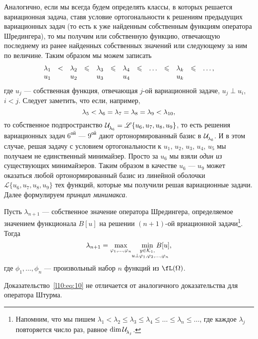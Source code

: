 Аналогично, если мы всегда будем определять классы, в которых решается вариационная задача, ставя условие ортогональности к решениям предыдущих вариационных задач (то есть к уже найденным собственным функциям оператора Шредингера), то мы получим или собственную функцию, отвечающую последнему из ранее найденных собственных значений или следующему за ним по величине. Таким образом мы можем записать
\begin{equation}\label{l10:eq:9}
	\hfill\begin{array}{ccccccccccccc}
		\lambda_1&<&\lambda_2&\leqslant&\lambda_3&\leqslant&\lambda_4&\leqslant&\ldots&\leqslant&\lambda_k&\leqslant&\ldots,\\
		u_1& &u_2& &u_3& &u_4& & & &u_k& &\\
	\end{array}\hfill
\end{equation} 
где $u_j$ --- собственная функция, отвечающая $j$-ой вариационной задаче, $u_j\perp u_i$, $i<j$. Следует заметить, что если, например, 
\begin{equation*}
	\hfill\lambda_5<\lambda_6=\lambda_7=\lambda_8=\lambda_9<\lambda_{10},\hfill
\end{equation*}
то собственное подпространство $\Ul[\lambda_6]=\mathscr{L}\{u_6,u_7,u_8,u_9\}$, то есть решения вариационных задач $6^{\text{ой}}$ --- $9^{\text{ой}}$ дают ортонормированный базис в $\Ul[\lambda_6]$. И в этом случае, решая задачу с условием ортогональности к $u_1$, $u_2$, $u_3$, $u_4$, $u_5$ мы получаем не единственный минимайзер. Просто за $u_6$ мы взяли \emph{один из} существующих минимайзеров. Таким образом в качестве $u_6$ --- $u_9$ может оказаться любой ортонормированный базис из линейной оболочки $\mathscr{L}\{u_6,u_7,u_8,u_9\}$ тех функций, которые мы получили решая вариационные задачи. Далее формулируем \emph{принцип минимакса}.
\begin{_teor}
	Пусть $\lambda_{n+1}$ --- собственное значение оператора Шредингера, определяемое значением функционала $B[u]$ на решении $(n+1)$-ой вриационной задачи\footnote{\label{l10:fn:1}Напомним, что мы пишем $\lambda_1<\lambda_2\leqslant\lambda_3\leqslant\lambda_4\leqslant\ldots\leqslant\lambda_n\leqslant\ldots$, где каждое $\lambda_j$ повторяется число раз, равное $\dim\Ul[\lambda_j]$.}. Тогда
	\begin{equation}\label{l10:eq:10}
		\hfill\lambda_{n+1}=\max\limits_{\phi_1,\ldots,\phi_{n}}\quad\min\limits_{\substack{y\in\K_1,\\\lefteqn{\scriptstyle \hspace*{-0.8cm}u\perp\phi_1,\phi_2,\ldots,\phi_{n}}}}B[u],\hfill
	\end{equation}
	где $\phi_1,\ldots,\phi_n$ --- произвольный набор $n$ функций из $\fL(\Omega)$.
\end{_teor}
\noindent Доказательство~\eqref{l10:eq:10} не отличается от аналогичного доказательства для оператора Штурма.


